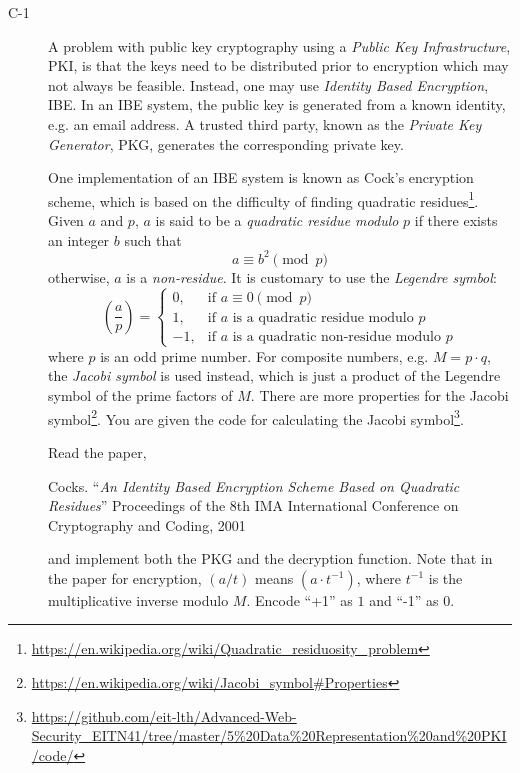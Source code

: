 \documentclass{article}
\begin{document}
		\begin{description}
			\item[C-1]{A problem with public key cryptography using a \emph{Public Key Infrastructure}, PKI, is that
				the keys need to be distributed prior to encryption which may not always be feasible.
				Instead, one may use \emph{Identity Based Encryption}, IBE. In an IBE system, the public key is generated
				from a known identity, e.g. an email address. A trusted third party, known as the \emph{Private Key Generator}, PKG,
				generates the corresponding private key.
				
				One implementation of an IBE system is known as Cock's encryption scheme,
				which is based on the difficulty of finding quadratic 
				residues\footnote{\url{https://en.wikipedia.org/wiki/Quadratic_residuosity_problem}}.
				Given $a$ and $p$, $a$ is said to be a \emph{quadratic residue modulo} $p$ if there exists an integer $b$
				such that
				\[
				a \equiv b^2 \pmod p
				\]
				otherwise, $a$ is a \emph{non-residue}.
				It is customary to use the \emph{Legendre symbol}:
				\[
				\left(\frac{a}{p}\right) = 
				\begin{cases}
				0, & \text{if $a \equiv 0 \pmod p$}\\
				1, & \text{if $a$ is a quadratic residue modulo $p$}\\
				-1, & \text{if $a$ is a quadratic non-residue modulo $p$}
				\end{cases}
				\]
				where $p$ is an odd prime number. For composite numbers, e.g. $M = p \cdot q$, the \emph{Jacobi symbol} is used
				instead, which is just a product of the Legendre symbol of the prime factors of $M$.
				There are more properties for the Jacobi symbol\footnote{\url{https://en.wikipedia.org/wiki/Jacobi_symbol#Properties}}. You are given the code
				for calculating the Jacobi symbol\footnote{\url{https://github.com/eit-lth/Advanced-Web-Security_EITN41/tree/master/5\%20Data\%20Representation\%20and\%20PKI/code/}}. 
				
				Read the paper,
				\begin{center}
					\begin{minipage}{0.8\textwidth}
						Cocks. ``\emph{An Identity Based Encryption Scheme Based on Quadratic Residues}'' 
						Proceedings of the 8th IMA International Conference on Cryptography and Coding, 2001
					\end{minipage}
				\end{center}
				and implement both the PKG and the decryption function. Note that in the paper for encryption, 
				$(a / t)$ means $(a \cdot t^{-1})$, where $t^{-1}$ is the multiplicative inverse modulo $M$.
				Encode ``+1'' as $1$ and ``-1'' as $0$.
				
}
\end{description}
\end{document}
